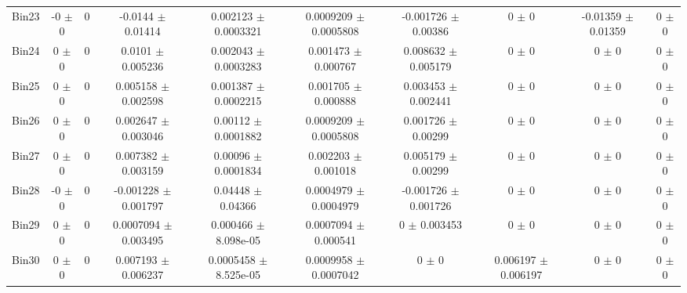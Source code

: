 \begin{tabular}{@{\extracolsep{4pt}}lccccccccc@{}}
     Bin23 & -0 $\pm$ 0 & 0 & -0.0144 $\pm$ 0.01414 & 0.002123 $\pm$ 0.0003321 & 0.0009209 $\pm$ 0.0005808 & -0.001726 $\pm$ 0.00386 & 0 $\pm$ 0 & -0.01359 $\pm$ 0.01359 & 0 $\pm$ 0 \\ 
     Bin24 & 0 $\pm$ 0 & 0 & 0.0101 $\pm$ 0.005236 & 0.002043 $\pm$ 0.0003283 & 0.001473 $\pm$ 0.000767 & 0.008632 $\pm$ 0.005179 & 0 $\pm$ 0 & 0 $\pm$ 0 & 0 $\pm$ 0 \\ 
     Bin25 & 0 $\pm$ 0 & 0 & 0.005158 $\pm$ 0.002598 & 0.001387 $\pm$ 0.0002215 & 0.001705 $\pm$ 0.000888 & 0.003453 $\pm$ 0.002441 & 0 $\pm$ 0 & 0 $\pm$ 0 & 0 $\pm$ 0 \\ 
     Bin26 & 0 $\pm$ 0 & 0 & 0.002647 $\pm$ 0.003046 & 0.00112 $\pm$ 0.0001882 & 0.0009209 $\pm$ 0.0005808 & 0.001726 $\pm$ 0.00299 & 0 $\pm$ 0 & 0 $\pm$ 0 & 0 $\pm$ 0 \\ 
     Bin27 & 0 $\pm$ 0 & 0 & 0.007382 $\pm$ 0.003159 & 0.00096 $\pm$ 0.0001834 & 0.002203 $\pm$ 0.001018 & 0.005179 $\pm$ 0.00299 & 0 $\pm$ 0 & 0 $\pm$ 0 & 0 $\pm$ 0 \\ 
     Bin28 & -0 $\pm$ 0 & 0 & -0.001228 $\pm$ 0.001797 & 0.04448 $\pm$ 0.04366 & 0.0004979 $\pm$ 0.0004979 & -0.001726 $\pm$ 0.001726 & 0 $\pm$ 0 & 0 $\pm$ 0 & 0 $\pm$ 0 \\ 
     Bin29 & 0 $\pm$ 0 & 0 & 0.0007094 $\pm$ 0.003495 & 0.000466 $\pm$ 8.098e-05 & 0.0007094 $\pm$ 0.000541 & 0 $\pm$ 0.003453 & 0 $\pm$ 0 & 0 $\pm$ 0 & 0 $\pm$ 0 \\ 
     Bin30 & 0 $\pm$ 0 & 0 & 0.007193 $\pm$ 0.006237 & 0.0005458 $\pm$ 8.525e-05 & 0.0009958 $\pm$ 0.0007042 & 0 $\pm$ 0 & 0.006197 $\pm$ 0.006197 & 0 $\pm$ 0 & 0 $\pm$ 0 \\ 
\hline\hline
  \end{tabular}
